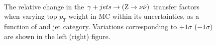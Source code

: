 \begin{figure}[!h]
  \centering
   ~~
  \\

  \caption{\label{fig:tfSyst_topPt_gjToZinv} The relative change in
  the $\gamma + jets \rightarrow ({\text Z} \rightarrow \nu\bar{\nu})$ transfer
  factors when varying top $p_{T}$ weight in MC within its uncertainties, as a function of \scalht and jet category. 
  Variations corresponding to $+1\sigma$ ($-1\sigma$) are shown in the left (right) figure. 
  }
\end{figure}

